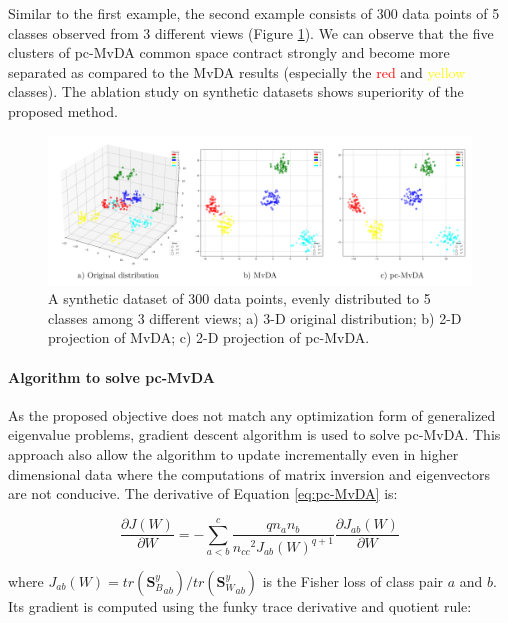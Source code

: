         Similar to the first example, the second example consists of 300 data points of 5 classes observed from 3 different views (Figure \ref{fig:synthetic2}).
        We can observe that the five clusters of pc-MvDA common space contract strongly and become more separated as compared to the MvDA results (especially the \textcolor{red}{red} and \textcolor{yellow}{yellow} classes).
        The ablation study on synthetic datasets shows superiority of the proposed method.

        \begin{figure}[htbp]
            \centering
            \includegraphics[width=1\linewidth]{figs/Synthetic2.png}
            \caption{A synthetic dataset of 300 data points, evenly distributed to 5 classes among 3 different views; a) 3-D original distribution; b) 2-D projection of MvDA; c) 2-D projection of pc-MvDA.}
            \label{fig:synthetic2}
        \end{figure}

    \paragraph{Algorithm to solve pc-MvDA}
        As the proposed objective does not match any optimization form of generalized eigenvalue problems, gradient descent algorithm is used to solve pc-MvDA. This approach also allow the algorithm to update incrementally even in higher dimensional data where the computations of matrix inversion and eigenvectors are not conducive. The derivative of Equation \eqref{eq:pc-MvDA} is:

        \begin{equation}
            \frac{\partial J\left(W\right)}{\partial W}=-\sum_{a<b}^{c}{\frac{qn_an_b}{{n_{cc}}^2{J_{ab}\left(W\right)}^{q+1}}\frac{\partial J_{ab}\left(W\right)}{\partial W}}
        \end{equation}

        where $J_{ab}\left(W\right)={tr\left({\boldsymbol{S}_B^y}_{ab}\right)}/{tr\left({\boldsymbol{S}_W^y}_{ab}\right)}$ is the Fisher loss of class pair $a$ and $b$. Its gradient is computed using the funky trace derivative and quotient rule:

